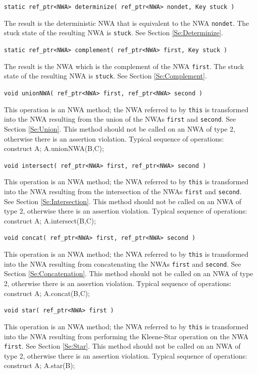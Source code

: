 \documentclass{llncs}
\begin{document}
\begin{description}
  \item\texttt{static ref\_ptr<NWA> determinize( ref\_ptr<NWA> nondet, Key stuck )}

    The result is the deterministic NWA that is equivalent to the NWA \texttt{nondet}.  The stuck state of the resulting NWA is \texttt{stuck}.  See Section \ref{Se:Determinize}.

  \item\texttt{static ref\_ptr<NWA> complement( ref\_ptr<NWA> first, Key stuck )}

    The result is the NWA which is the complement of the NWA \texttt{first}.  The stuck state of the resulting NWA is \texttt{stuck}.  See Section \ref{Se:Complement}.

  \item\texttt{void unionNWA( ref\_ptr<NWA> first, ref\_ptr<NWA> second )}

    This operation is an NWA method; the NWA referred to by \texttt{this} is transformed into the NWA resulting from the union of the NWAs \texttt{first} and \texttt{second}.  See Section \ref{Se:Union}.  This method should not be called on an NWA of type 2, otherwise there is an assertion violation.  Typical sequence of operations: construct A; A.unionNWA(B,C);

 \item\texttt{void intersect( ref\_ptr<NWA> first, ref\_ptr<NWA> second )}

    This operation is an NWA method; the NWA referred to by \texttt{this} is transformed into the NWA resulting from the intersection of the NWAs \texttt{first} and \texttt{second}.  See Section \ref{Se:Intersection}.  This method should not be called on an NWA of type 2, otherwise there is an assertion violation.  Typical sequence of operations: construct A; A.intersect(B,C);

  \item\texttt{void concat( ref\_ptr<NWA> first, ref\_ptr<NWA> second )}

    This operation is an NWA method; the NWA referred to by \texttt{this} is transformed into the NWA resulting from concatenating the NWAs \texttt{first} and \texttt{second}.  See Section \ref{Se:Concatenation}.  This method should not be called on an NWA of type 2, otherwise there is an assertion violation.  Typical sequence of operations: construct A; A.concat(B,C);

  \item\texttt{void star( ref\_ptr<NWA> first )}

    This operation is an NWA method; the NWA referred to by \texttt{this} is transformed into the NWA resulting from performing the Kleene-Star operation on the NWA \texttt{first}.  See Section \ref{Se:Star}.  This method should not be called on an NWA of type 2, otherwise there is an assertion violation.  Typical sequence of operations: construct A; A.star(B);


\end{description}
\end{document}
